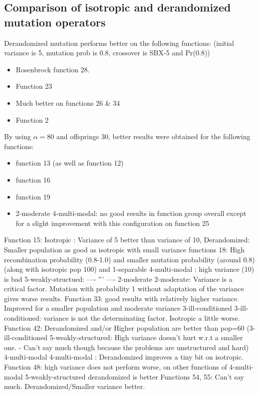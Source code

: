 \documentclass{sig-alternate}
\begin{document}
\subsection{Comparison of isotropic and derandomized mutation operators}
Derandomized mutation performs better on the following functions: (initial variance is 5, mutation prob is 0.8, crossover is  SBX-5 and Pr(0.8))
\begin{itemize}
\item Rosenbrock function 28.
\item Function 23
\item Much better on functions 26 \& 34
\item Function 2
\end{itemize}
By using $\alpha = 80$ and offsprings 30, better results were obtained for the following functions:
\begin{itemize}
\item function 13 (as well as function 12)
\item function 16
\item function 19
\item 2-moderate 4-multi-modal:  no good results in function group overall except for a slight improvement with this configuration on function 25
\end{itemize}
Function 15: Isotropic : Variance of 5 better than variance of 10, Derandomized: Smaller population as good as isotropic with small variance
functions 18: High recombination probability (0.8-1.0)  and smaller mutation probability (around 0.8)  (along with isotropic pop 100) and
1-separable 4-multi-modal : high variance (10) is bad
            5-weakly-structued: ---- ''' ----
2-moderate 2-moderate: Variance is a critical factor. Mutation with probability 1 without adaptation of the variance gives worse results.
Function 33: good results with relatively higher variance. Improved for a smaller population and moderate variance
3-ill-conditioned 3-ill-conditioned: variance is not the determinating factor. Isotropic a little worse.
Function 42: Derandomized and/or Higher population are better than pop=60
(3-ill-conditioned 5-weakly-structured: High variance doesn't hurt w.r.t a smaller one. - Can't say much though because the problems are unstructured and hard)
4-multi-modal 4-multi-modal : Derandomized improves a tiny bit on isotropic.
Function 48: high variance does not perform worse, on other functions of 4-multi-modal 5-weakly-structured derandomized is better
Functions 54, 55: Can't say much. Derandomized/Smaller variance better.
\end{document}
